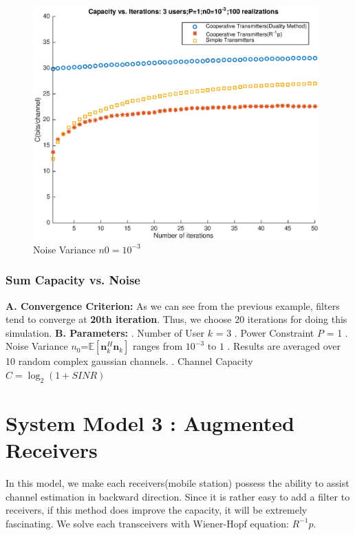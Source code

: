 \documentclass[11pt, oneside]{article}   	%
\begin{document}
\begin{figure}[H]
    \centering
    \centerline{\includegraphics[width=110mm]{6}}
    \caption{Noise Variance $n0=10^{-3}$}
\end{figure} 

\subsubsection{Sum Capacity vs. Noise}
\textbf{A. Convergence Criterion:} As we can see from the previous example, filters tend to converge at \textbf{20th iteration}. Thus, we choose 20 iterations for doing this simulation.
\newline
\textbf{B. Parameters:}
. Number of User $k$ = 3
. Power Constraint $P$ = 1
. Noise Variance $n_0$=$\mathbb{E}[\textbf{n}_k^{H}\textbf{n}_k]$ ranges from $10^{-3}$ to $1$
. Results are averaged over 10 random complex gaussian channels.
. Channel Capacity $C = \log_2 ({1+SINR})$


\newpage

\section{System Model 3 : Augmented Receivers}
In this model, we make each receivers(mobile station) possess the ability to assist channel estimation in backward direction. Since it is rather easy to add a filter to receivers, if this method does improve the capacity, it will be extremely fascinating. We solve each transceivers with Wiener-Hopf equation: $R^{-1}p$.
\end{document}
